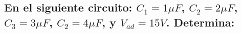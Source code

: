 \documentclass[10pt, twoside]{article}
\begin{document}
\subsection*{En el siguiente circuito: $C_1 = 1\mu F$,
	$C_2 = 2\mu F$,
	$C_3 = 3\mu F$,
	$C_2 = 4\mu F$,
	y $V_{ad}=15V$. Determina:}%
\end{document}
